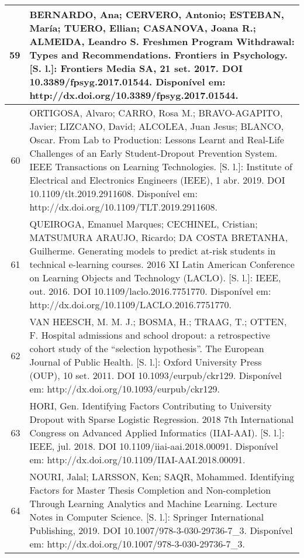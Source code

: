 \begin{apendicesenv}
\begin{longtable}[c]{|r|l|}
59 &
  \multicolumn{1}{p{14.5cm}|}{BERNARDO, Ana; CERVERO, Antonio; ESTEBAN, María; TUERO, Ellian; CASANOVA, Joana R.; ALMEIDA, Leandro S. Freshmen Program Withdrawal: Types and Recommendations. Frontiers in Psychology. {[}S. l.{]}: Frontiers Media SA, 21 set. 2017. DOI 10.3389/fpsyg.2017.01544. Disponível em: http://dx.doi.org/10.3389/fpsyg.2017.01544.} \\ \hline
60 &
  \multicolumn{1}{p{14.5cm}|}{ORTIGOSA, Alvaro; CARRO, Rosa M.; BRAVO-AGAPITO, Javier; LIZCANO, David; ALCOLEA, Juan Jesus; BLANCO, Oscar. From Lab to Production: Lessons Learnt and Real-Life Challenges of an Early Student-Dropout Prevention System. IEEE Transactions on Learning Technologies. {[}S. l.{]}: Institute of Electrical and Electronics Engineers (IEEE), 1 abr. 2019. DOI 10.1109/tlt.2019.2911608. Disponível em: http://dx.doi.org/10.1109/TLT.2019.2911608.} \\ \hline
61 &
  \multicolumn{1}{p{14.5cm}|}{QUEIROGA, Emanuel Marques; CECHINEL, Cristian; MATSUMURA ARAUJO, Ricardo; DA COSTA BRETANHA, Guilherme. Generating models to predict at-risk students in technical e-learning courses. 2016 XI Latin American Conference on Learning Objects and Technology (LACLO). {[}S. l.{]}: IEEE, out. 2016. DOI 10.1109/laclo.2016.7751770. Disponível em: http://dx.doi.org/10.1109/LACLO.2016.7751770.} \\ \hline
62 &
  \multicolumn{1}{p{14.5cm}|}{VAN HEESCH, M. M. J.; BOSMA, H.; TRAAG, T.; OTTEN, F. Hospital admissions and school dropout: a retrospective cohort study of the “selection hypothesis”. The European Journal of Public Health. {[}S. l.{]}: Oxford University Press (OUP), 10 set. 2011. DOI 10.1093/eurpub/ckr129. Disponível em: http://dx.doi.org/10.1093/eurpub/ckr129.} \\ \hline
63 &
  \multicolumn{1}{p{14.5cm}|}{HORI, Gen. Identifying Factors Contributing to University Dropout with Sparse Logistic Regression. 2018 7th International Congress on Advanced Applied Informatics (IIAI-AAI). {[}S. l.{]}: IEEE, jul. 2018. DOI 10.1109/iiai-aai.2018.00091. Disponível em: http://dx.doi.org/10.1109/IIAI-AAI.2018.00091.} \\ \hline
64 &
  \multicolumn{1}{p{14.5cm}|}{NOURI, Jalal; LARSSON, Ken; SAQR, Mohammed. Identifying Factors for Master Thesis Completion and Non-completion Through Learning Analytics and Machine Learning. Lecture Notes in Computer Science. {[}S. l.{]}: Springer International Publishing, 2019. DOI 10.1007/978-3-030-29736-7\_3. Disponível em: http://dx.doi.org/10.1007/978-3-030-29736-7\_3.} \\ \hline

\end{longtable}
\end{apendicesenv}
